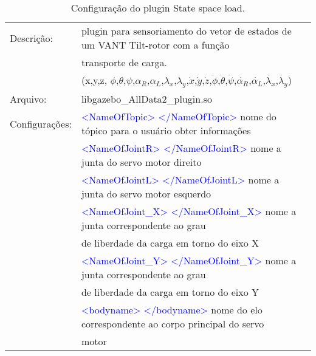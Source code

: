 		\begin{table}[h]
		\centering
		\begin{tabular}{|r|lr|}
		\hline
		\multicolumn{1}{|l|}{Descrição: } 
		
		& plugin para sensoriamento do vetor de estados de um VANT Tilt-rotor com a função &         \\
		& transporte de carga. &       \\
		&
		(x,y,z, $\phi$,$\theta$,$\psi$,$\alpha_R$,$\alpha_L$,$\lambda_x$,$\lambda_y$,$\dot{x}$,$\dot{y}$,$\dot{z}$,$\dot{\phi}$,$\dot{\theta}$,$\dot{\psi}$,$\dot{\alpha_R}$,$\dot{\alpha_L}$,$\dot{\lambda_x}$,$\dot{\lambda_y}$)   &  \\
		\hline
		\multicolumn{1}{|l|}{Arquivo: } & libgazebo\_AllData2\_plugin.so &          \\
		\hline
		\multicolumn{1}{|l|}{Configurações: } & \textcolor{blue}{<NameOfTopic> </NameOfTopic>} nome do tópico para o usuário obter informações &         \\
		& \textcolor{blue}{<NameOfJointR> </NameOfJointR>} nome a junta do servo motor direito &         \\
		& \textcolor{blue}{<NameOfJointL> </NameOfJointL>} nome a junta do servo motor esquerdo &        \\
		& \textcolor{blue}{<NameOfJoint\_X> </NameOfJoint\_X>} nome a junta correspondente ao grau &    \\
		& de liberdade da carga em torno do eixo X &         \\
		& \textcolor{blue}{<NameOfJoint\_Y> </NameOfJoint\_Y>} nome a junta correspondente ao grau  &        \\
		& de liberdade da carga em torno do eixo Y &         \\
		& \textcolor{blue}{<bodyname> </bodyname>} nome do elo correspondente ao corpo principal do servo &        \\
		&  motor &        \\
		\hline
		\end{tabular}%
		\caption{Configuração do plugin State space load.}
		\label{tab:Statespaceload}%
		\end{table}%
		
